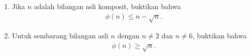 \documentclass[11pt]{scrartcl}
\begin{document}
\begin{enumerate}[resume]
    \item Jika $n$ adalah bilangan asli komposit, buktikan bahwa
    \begin{align*}
        \phi(n) \le n - \sqrt{n}.
    \end{align*}

    \item Untuk sembarang bilangan asli $n$ dengan $n \neq 2$ dan $n \neq 6$, buktikan bahwa
    \begin{align*}
        \phi(n) \ge \sqrt{n}.
    \end{align*}
\end{enumerate}
\end{document}
